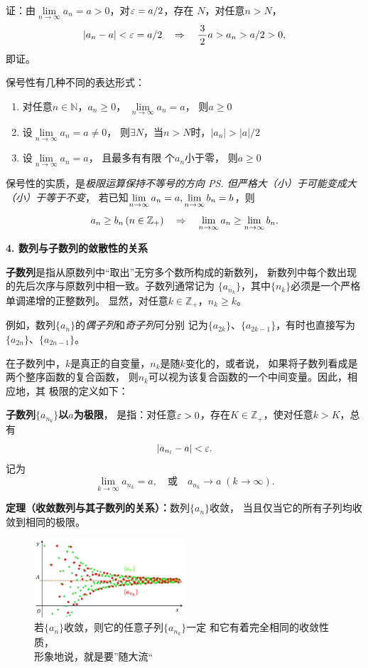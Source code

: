 证：由$\lim\limits_{n\to\infty}a_n=a>0$，对$\varepsilon=a/2$，存在
$N$，对任意$n>N$，
$$|a_n-a|<\varepsilon=a/2\quad\Rightarrow\quad \displaystyle\frac{\,{3}\,}{\,{2}\,}a>a_n>a/2>0,$$
即证。\fin
		
保号性有几种不同的表达形式：
\begin{thx}
	\begin{enumerate}[\bf 推论1：]
	  \item 对任意$n\in\mathbb{N}$，$a_n\geq
	  0$， $\lim\limits_{n\to\infty}a_n=a$， 则$a\geq 0$
	  \item 设$\lim\limits_{n\to\infty}a_n=a\ne
	  0$， 则$\exists N$，当$n>N$时，$|a_n|>|a|/2$
	  \item  设$\lim\limits_{n\to\infty}a_n=a$， 且最多有有限
	  个$a_n$小于零， 则$a\geq 0$
	\end{enumerate}	
\end{thx}

保号性的实质，是{\it 极限运算保持不等号的方向
\ps{但严格大（小）于可能变成大（小）于等于}不变}，
若已知$\lim\limits_{n\to\infty} a_n=a,\lim\limits_{n\to\infty} b_n=b$，则
$$a_n\geq b_n\,(n\in\mathbb{Z}_+)\quad\Rightarrow
\quad\lim\limits_{n\to\infty} a_n\geq\lim\limits_{n\to\infty} b_n.$$

\bs
{\bf 4. 数列与子数列的敛散性的关系}

{\bf 子数列}是指从原数列中“取出”无穷多个数所构成的新数列，
新数列中每个数出现的先后次序与原数列中相一致。子数列通常记为
$\{a_{n_k}\}$，其中$\{n_k\}$必须是一个严格单调递增的正整数列。
显然，对任意$k\in\mathbb{Z}_+$，$n_k\geq k$。

例如，数列$\{a_n\}$的{\it 偶子列}和{\it 奇子列}可分别
记为$\{a_{2k}\}$、$\{a_{2k-1}\}$，有时也直接写为
$\{a_{2n}\}$、$\{a_{2n-1}\}$。

在子数列中，$k$是真正的自变量，$n_k$是随$k$变化的，或者说，
如果将子数列看成是两个整序函数的复合函数，
则$n_k$可以视为该复合函数的一个中间变量。因此，相应地，其
极限的定义如下：

{\bf 子数列$\{a_{n_k}\}$以$a$为极限}，
是指：对任意$\varepsilon>0$，存在$K\in\mathbb{Z}_+$，使对任意$k>K$，总有
$$|a_{n_l}-a|<\varepsilon.$$
记为
$$\lim\limits_{k\to\infty}a_{n_k}=a,\quad 
\mbox{或}\quad a_{n_k}\to a\;{(k\to\infty)}.$$

\begin{thx}
	{\bf 定理（收敛数列与其子数列的关系）：}数列$\{a_n\}$收敛，
	当且仅当它的所有子列均收敛到相同的极限。
\end{thx}

\begin{figure}[h]
	\centering
	\includegraphics[width=0.5\textwidth]{./Images/Ch01/anank.pdf}
	\caption{若$\{a_n\}$收敛，则它的任意子列$\{a_{n_k}\}$一定
	和它有着完全相同的收敛性质，\\
	形象地说，就是要”随大流“}
	\label{fig:anank}
\end{figure}

